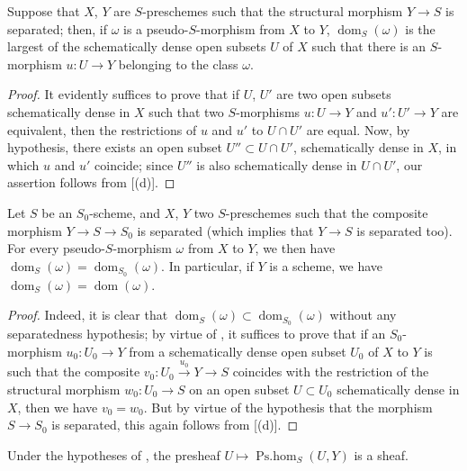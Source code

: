 \begin{proposition}[20.2.4]
\label{IV.20.2.4}
Suppose that $X$, $Y$ are $S$-preschemes such that the structural morphism $Y\to S$ is separated; then, if $\omega$ is a pseudo-$S$-morphism from $X$ to $Y$, $\operatorname{dom}_S(\omega)$ is the largest of the schematically dense open subsets $U$ of $X$ such that there is an $S$-morphism $u:U\to Y$ belonging to the class $\omega$.
\end{proposition}

\begin{proof}
It evidently suffices to prove that if $U$, $U'$ are two open subsets schematically dense in $X$ such that two $S$-morphisms $u:U\to Y$ and $u':U'\to Y$ are equivalent, then the restrictions of $u$ and $u'$ to $U\cap U'$ are equal.
Now, by hypothesis, there exists an open subset $U''\subset U\cap U'$, schematically dense in $X$, in which $u$ and $u'$ coincide; since $U''$ is also schematically dense in $U\cap U'$, our assertion follows from [(d)].
\end{proof}

\begin{corollary}[20.2.5]
\label{IV.20.2.5}
Let $S$ be an $S_0$-scheme, and $X$, $Y$ two $S$-preschemes such that the composite morphism $Y\to S\to S_0$ is separated (which implies  that $Y\to S$ is separated too).
For every pseudo-$S$-morphism $\omega$ from $X$ to $Y$, we then have $\operatorname{dom}_S(\omega)=\operatorname{dom}_{S_0}(\omega)$.
In particular, if $Y$ is a scheme, we have $\operatorname{dom}_S(\omega)=\operatorname{dom}(\omega)$.
\end{corollary}

\begin{proof}
Indeed, it is clear that $\operatorname{dom}_S(\omega)\subset\operatorname{dom}_{S_0}(\omega)$ without any separatedness hypothesis; by virtue of , it suffices to prove that if an $S_0$-morphism $u_0:U_0\to Y$ from a schematically dense open subset
$U_0$ of $X$ to $Y$ is such that the composite $v_0:U_0\xrightarrow{u_0}Y\to S$ coincides with the restriction of the structural morphism $w_0:U_0\to S$ on an open subset $U\subset U_0$ schematically dense in $X$, then we have $v_0=w_0$.
But by virtue of the hypothesis that the morphism $S\to S_0$ is separated, this again follows from [(d)].
\end{proof}

\begin{corollary}[20.2.6]
\label{IV.20.2.6}
Under the hypotheses of , the presheaf $U\mapsto\operatorname{Ps.hom}_S(U,Y)$ is a sheaf.
\end{corollary}

